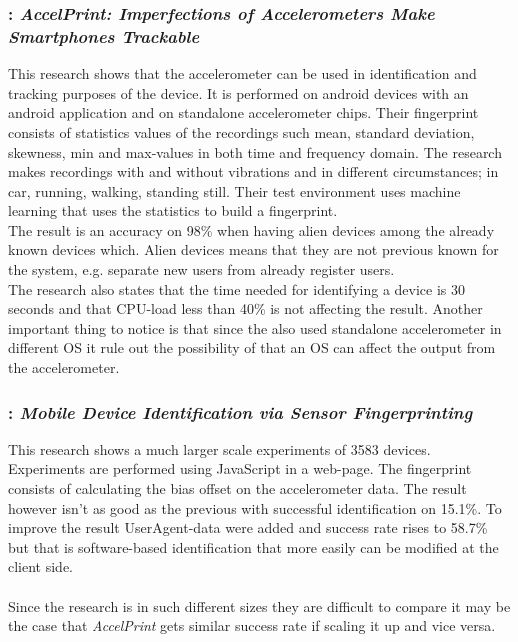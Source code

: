 \subsubsection*{\cite{sensor:accelPrint}: \textit{AccelPrint: Imperfections of Accelerometers Make Smartphones Trackable}}
This research shows that the accelerometer can be used in identification and tracking purposes of the device. It is performed on android devices with an android application and on standalone accelerometer chips. Their fingerprint consists of statistics values of the recordings such mean, standard deviation, skewness, min and max-values in both time and frequency domain. The research makes recordings with and without vibrations and in different circumstances; in car, running, walking, standing still. Their test environment uses machine learning that uses the statistics to build a fingerprint.\\
The result is an accuracy on 98\% when having alien devices among the already known devices which. Alien devices means that they are not previous known for the system, e.g. separate new users from already register users. \\
The research also states that the time needed for identifying a device is 30 seconds and that CPU-load less than 40\% is not affecting the result. Another important thing to notice is that since the also used standalone accelerometer in different OS it rule out the possibility of that an OS can affect the output from the accelerometer.~\cite[]{sensor:accelPrint}

\subsubsection*{\cite{sensor:micSpeak}: \textit{Mobile Device Identification via Sensor Fingerprinting}}
This research shows a much larger scale experiments of 3583 devices. Experiments are performed using JavaScript in a web-page. The fingerprint consists of calculating the bias offset on the accelerometer data. The result however isn't as good as the previous with successful identification on 15.1\%. To improve the result UserAgent-data were added and success rate rises to 58.7\% but that is software-based identification that more easily can be modified at the client side.~\cite[]{sensor:micSpeak}\\
\\
Since the research is in such different sizes they are difficult to compare it may be the case that \textit{AccelPrint} gets similar success rate if scaling it up and vice versa. \\
